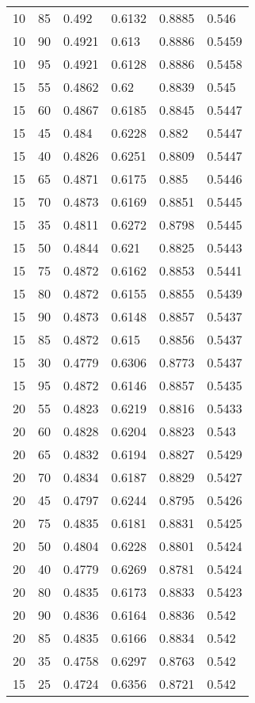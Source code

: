 \begin{center}
\begin{longtable}{|l|l|l|l|l|l|}
10 & 85 & 0.492  & 0.6132 & 0.8885 & 0.546  \\
10 & 90 & 0.4921 & 0.613  & 0.8886 & 0.5459 \\
10 & 95 & 0.4921 & 0.6128 & 0.8886 & 0.5458 \\
15 & 55 & 0.4862 & 0.62   & 0.8839 & 0.545  \\
15 & 60 & 0.4867 & 0.6185 & 0.8845 & 0.5447 \\
15 & 45 & 0.484  & 0.6228 & 0.882  & 0.5447 \\
15 & 40 & 0.4826 & 0.6251 & 0.8809 & 0.5447 \\
15 & 65 & 0.4871 & 0.6175 & 0.885  & 0.5446 \\
15 & 70 & 0.4873 & 0.6169 & 0.8851 & 0.5445 \\
15 & 35 & 0.4811 & 0.6272 & 0.8798 & 0.5445 \\
15 & 50 & 0.4844 & 0.621  & 0.8825 & 0.5443 \\
15 & 75 & 0.4872 & 0.6162 & 0.8853 & 0.5441 \\
15 & 80 & 0.4872 & 0.6155 & 0.8855 & 0.5439 \\
15 & 90 & 0.4873 & 0.6148 & 0.8857 & 0.5437 \\
15 & 85 & 0.4872 & 0.615  & 0.8856 & 0.5437 \\
15 & 30 & 0.4779 & 0.6306 & 0.8773 & 0.5437 \\
15 & 95 & 0.4872 & 0.6146 & 0.8857 & 0.5435 \\
20 & 55 & 0.4823 & 0.6219 & 0.8816 & 0.5433 \\
20 & 60 & 0.4828 & 0.6204 & 0.8823 & 0.543  \\
20 & 65 & 0.4832 & 0.6194 & 0.8827 & 0.5429 \\
20 & 70 & 0.4834 & 0.6187 & 0.8829 & 0.5427 \\
20 & 45 & 0.4797 & 0.6244 & 0.8795 & 0.5426 \\
20 & 75 & 0.4835 & 0.6181 & 0.8831 & 0.5425 \\
20 & 50 & 0.4804 & 0.6228 & 0.8801 & 0.5424 \\
20 & 40 & 0.4779 & 0.6269 & 0.8781 & 0.5424 \\
20 & 80 & 0.4835 & 0.6173 & 0.8833 & 0.5423 \\
20 & 90 & 0.4836 & 0.6164 & 0.8836 & 0.542  \\
20 & 85 & 0.4835 & 0.6166 & 0.8834 & 0.542  \\
20 & 35 & 0.4758 & 0.6297 & 0.8763 & 0.542  \\
15 & 25 & 0.4724 & 0.6356 & 0.8721 & 0.542  \\

\end{longtable}
\end{center}
